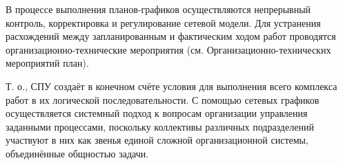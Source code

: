 В процессе выполнения планов-графиков осуществляются непрерывный контроль, корректировка и регулирование сетевой модели. Для устранения расхождений между запланированным и фактическим ходом работ проводятся организационно-технические мероприятия (см. Организационно-технических мероприятий план).

Т. о., СПУ создаёт в конечном счёте условия для выполнения всего комплекса работ в их логической последовательности. С помощью сетевых графиков осуществляется системный подход к вопросам организации управления заданными процессами, поскольку коллективы различных подразделений участвуют в них как звенья единой сложной организационной системы, объединённые общностью задачи.